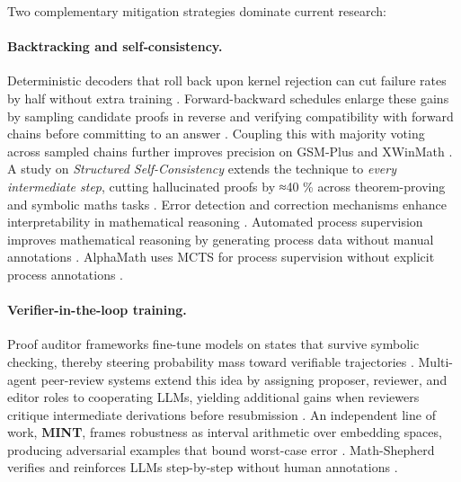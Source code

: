 \documentclass[acmsmall,anonymous]{acmart}
\begin{document}
Two complementary mitigation strategies dominate current research:

\paragraph{Backtracking and self‐consistency.}
Deterministic decoders that roll back upon kernel rejection can cut failure rates by half without extra training \cite{lee2024backtracking}.  Forward-backward schedules enlarge these gains by sampling candidate proofs in reverse and verifying compatibility with forward chains before committing to an answer \cite{jiang-2024-forward-backward}.  Coupling this with majority voting across sampled chains further improves precision on GSM‐Plus and XWinMath \cite{li2024mugglemath}. A study on \emph{Structured Self-Consistency} extends the
  technique to \emph{every intermediate step}, cutting
  hallucinated proofs by ≈40 \% across theorem-proving and symbolic
  maths tasks \cite{Liu2025SC}. Error detection and correction mechanisms enhance interpretability in mathematical reasoning \cite{leiva2025errordetection,anonymous2025errordetection}. Automated process supervision improves mathematical reasoning by generating process data without manual annotations \cite{luo2024improve}. AlphaMath uses MCTS for process supervision without explicit process annotations \cite{wang2024 d alpha}.

\paragraph{Verifier-in-the-loop training.}
Proof auditor frameworks fine-tune models on states that survive symbolic checking, thereby steering probability mass toward verifiable trajectories \cite{wang2024mumath}.  Multi-agent peer-review systems extend this idea by assigning proposer, reviewer, and editor roles to cooperating LLMs, yielding additional gains when reviewers critique intermediate derivations before resubmission \cite{xu-2023-peer-review}.  An independent line of work, \textbf{MINT}, frames robustness as interval arithmetic over embedding spaces, producing adversarial examples that bound worst-case error \cite{li2024mint}. Math-Shepherd verifies and reinforces LLMs step-by-step without human annotations \cite{wang2024c}.
\end{document}

